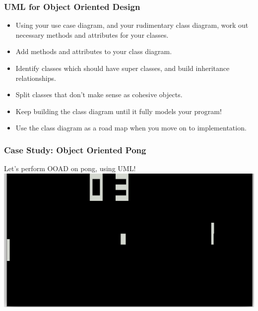 \documentclass{beamer}
\begin{document}
\begin{frame}
    \frametitle{UML for Object Oriented Design}
    \begin{itemize}[<+->]
        \item Using your use case diagram, and your rudimentary class diagram,
            work out necessary methods and attributes for your classes.
        \item Add methods and attributes to your class diagram.
        \item Identify classes which should have super classes, and build 
            inheritance relationships.
        \item Split classes that don't make sense as cohesive objects.
        \item Keep building the class diagram until it fully models your program!
        \item Use the class diagram as a road map when you move on to implementation.
    \end{itemize}
\end{frame}

\begin{frame}
    \frametitle{Case Study: Object Oriented Pong}
    Let's perform OOAD on pong, using UML!
    \includegraphics[width=\textwidth]{images/pong}
\end{frame}
\end{document}
